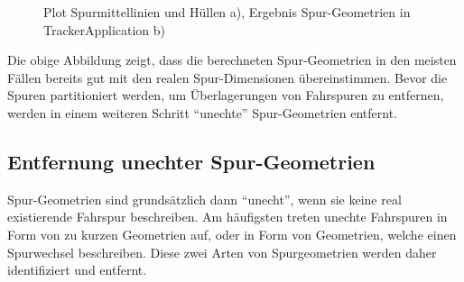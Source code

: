 \begin{figure}[H]
    \centering
    \caption{Plot Spurmittellinien und Hüllen a), Ergebnis Spur-Geometrien in TrackerApplication b)}
    \label{fig:real2_results_geometry_definition}
\end{figure}

Die obige Abbildung zeigt, dass die berechneten Spur-Geometrien in den meisten Fällen bereits gut
mit den realen Spur-Dimensionen übereinstimmen. Bevor die Spuren partitioniert werden, um Überlagerungen
von Fahrspuren zu entfernen, werden in einem weiteren Schritt ``unechte'' Spur-Geometrien entfernt.

\subsection*{Entfernung unechter Spur-Geometrien}

Spur-Geometrien sind grundsätzlich dann ``unecht'', wenn sie keine real existierende Fahrspur beschreiben.
Am häufigsten treten unechte Fahrspuren in Form von zu kurzen Geometrien auf, oder in Form von Geometrien,
welche einen Spurwechsel beschreiben. Diese zwei Arten von Spurgeometrien werden daher identifiziert
und entfernt.

